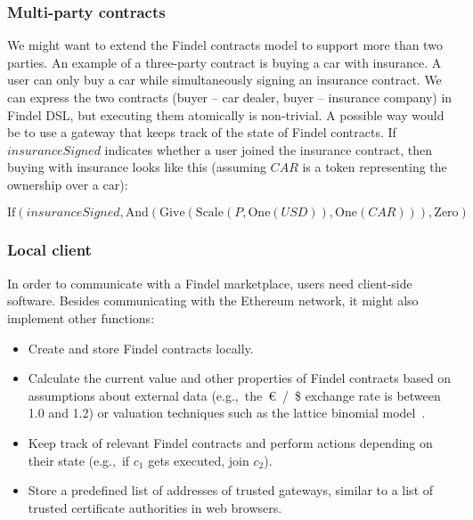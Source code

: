 \subsubsection{Multi-party contracts}

We might want to extend the Findel contracts model to support more than two parties.
An example of a three-party contract is buying a car with insurance.
A user can only buy a car while simultaneously signing an insurance contract.
We can express the two contracts (buyer -- car dealer, buyer -- insurance company) in Findel DSL, but executing them atomically is non-trivial.
A possible way would be to use a gateway that keeps track of the state of Findel contracts.
If \(insuranceSigned\) indicates whether a user joined the insurance contract, then buying with insurance looks like this (assuming \(CAR\) is a token representing the ownership over a car):

\[\mathrm{If}(insuranceSigned,\mathrm{And}(\mathrm{Give}(\mathrm{Scale}(P,\mathrm{One}(USD)),\mathrm{One}(CAR))),\mathrm{Zero})\]


\subsubsection{Local client}

In order to communicate with a Findel marketplace, users need client-side software.
Besides communicating with the Ethereum network, it might also implement other functions:
\begin{itemize}
	\item Create and store Findel contracts locally.
	\item Calculate the current value and other properties of Findel contracts based on assumptions about external data (e.g.,~the~\euro~/~\$ exchange rate is between 1.0 and 1.2) or valuation techniques such as the lattice binomial model~\cite{Cox1979}.
	\item Keep track of relevant Findel contracts and perform actions depending on their state (e.g.,~if \(c_1\) gets executed, join \(c_2\)).
	\item Store a predefined list of addresses of trusted gateways, similar to a list of trusted certificate authorities in web browsers.
\end{itemize}



